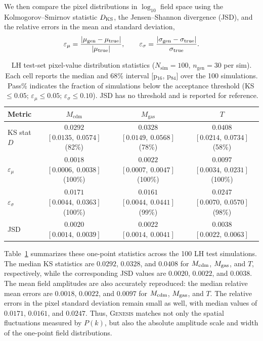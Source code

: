 \documentclass[usenatbib]{mnras}
\newcommand{\Mcdm}{M_{\rm cdm}}
\newcommand{\Mgas}{M_{\rm gas}}
\newcommand{\Tgas}{T}
\begin{document}
We then compare the pixel distributions in $\log_{10}$ field space using
the Kolmogorov--Smirnov statistic $D_{\rm KS}$, the Jensen--Shannon
divergence (JSD), and the relative errors in the mean and standard
deviation,
\begin{equation}
  \varepsilon_\mu
  =
  \frac{|\mu_{\rm gen}-\mu_{\rm true}|}{|\mu_{\rm true}|},
  \qquad
  \varepsilon_\sigma
  =
  \frac{|\sigma_{\rm gen}-\sigma_{\rm true}|}{\sigma_{\rm true}}.
  \label{eq:pixel_errors}
\end{equation}

\begin{table}
  \centering
  \small
  \setlength{\tabcolsep}{4pt}
  \renewcommand{\arraystretch}{1.08}
  \begin{tabular*}{\textwidth}{@{\extracolsep{\fill}}lccc@{}}
    \toprule
    Metric & $M_{\mathrm{cdm}}$ & $M_{\mathrm{gas}}$ & $T$ \\
    \midrule
    KS stat $D$ & $0.0292$ $[0.0135,\ 0.0574]$ (82\%) & $0.0328$ $[0.0149,\ 0.0568]$ (78\%) & $0.0408$ $[0.0214,\ 0.0734]$ (58\%) \\
    $\varepsilon_\mu$ & $0.0018$ $[0.0006,\ 0.0038]$ (100\%) & $0.0022$ $[0.0007,\ 0.0047]$ (100\%) & $0.0097$ $[0.0034,\ 0.0231]$ (100\%) \\
    $\varepsilon_\sigma$ & $0.0171$ $[0.0044,\ 0.0363]$ (100\%) & $0.0161$ $[0.0044,\ 0.0441]$ (99\%) & $0.0247$ $[0.0070,\ 0.0570]$ (98\%) \\
    JSD & $0.0020$ $[0.0014,\ 0.0039]$ & $0.0022$ $[0.0014,\ 0.0041]$ & $0.0038$ $[0.0022,\ 0.0063]$ \\
    \bottomrule
  \end{tabular*}
  \caption{LH test-set pixel-value distribution statistics
    ($N_{\mathrm{sim}}=100$, $n_{\mathrm{gen}}=30$ per sim). Each cell reports
    the median and 68\% interval [p$_{16}$, p$_{84}$] over the 100 simulations.
    Pass\% indicates the fraction of simulations below the acceptance threshold
    (KS\,$\leq\!0.05$; $\varepsilon_\mu\!\leq\!0.05$;
    $\varepsilon_\sigma\!\leq\!0.10$). JSD has no threshold and is reported for
    reference.}
  \label{tab:lh_pdf}
\end{table}

Table~\ref{tab:lh_pdf} summarizes these one-point statistics across
the 100 LH test simulations. The median KS statistics are $0.0292$,
$0.0328$, and $0.0408$ for $\Mcdm$, $\Mgas$, and $\Tgas$,
respectively, while the corresponding JSD values are $0.0020$,
$0.0022$, and $0.0038$. The mean field amplitudes are also accurately
reproduced: the median relative mean errors are $0.0018$, $0.0022$,
and $0.0097$ for $\Mcdm$, $\Mgas$, and $\Tgas$. The relative errors
in the pixel standard deviation remain small as well, with median
values of $0.0171$, $0.0161$, and $0.0247$. Thus, \textsc{Genesis}
matches not only the spatial fluctuations measured by $P(k)$, but
also the absolute amplitude scale and width of the one-point field
distributions.
\end{document}
